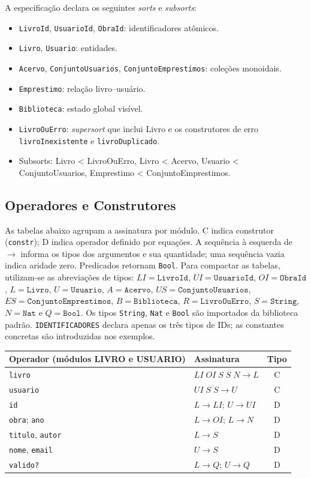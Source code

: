 \documentclass[a4paper,12pt]{article}
\begin{document}
A especificação declara os seguintes \textit{sorts} e \textit{subsorts}:
\begin{itemize}
    \item \texttt{LivroId}, \texttt{UsuarioId}, \texttt{ObraId}: identificadores
          atômicos.
    \item \texttt{Livro}, \texttt{Usuario}: entidades.
    \item \texttt{Acervo}, \texttt{ConjuntoUsuarios},
          \texttt{ConjuntoEmprestimos}: coleções monoidais.
    \item \texttt{Emprestimo}: relação livro–usuário.
    \item \texttt{Biblioteca}: estado global visível.
    \item \texttt{LivroOuErro}: \textit{supersort} que inclui Livro e os
          construtores de erro \texttt{livroInexistente} e
          \texttt{livroDuplicado}.
    \item Subsorts: Livro < LivroOuErro, Livro < Acervo, Usuario <
          ConjuntoUsuarios, Emprestimo < ConjuntoEmprestimos.
\end{itemize}

\subsection{Operadores e Construtores}

As tabelas abaixo agrupam a assinatura por módulo. C indica construtor
(\texttt{constr}); D indica operador definido por equações. A sequência à
esquerda de $\to$ informa os tipos dos argumentos e sua quantidade; uma
sequência vazia indica aridade zero. Predicados retornam \texttt{Bool}.
Para compactar as tabelas, utilizam-se as abreviações de tipos:
\(LI=\texttt{LivroId}\), \(UI=\texttt{UsuarioId}\),
\(OI=\texttt{ObraId}\), \(L=\texttt{Livro}\),
\(U=\texttt{Usuario}\), \(A=\texttt{Acervo}\),
\(US=\texttt{ConjuntoUsuarios}\), \(ES=\texttt{ConjuntoEmprestimos}\),
\(B=\texttt{Biblioteca}\), \(R=\texttt{LivroOuErro}\),
\(S=\texttt{String}\), \(N=\texttt{Nat}\) e \(Q=\texttt{Bool}\).
Os tipos \texttt{String}, \texttt{Nat} e \texttt{Bool} são importados da
biblioteca padrão. \texttt{IDENTIFICADORES} declara apenas os três tipos de IDs;
as constantes concretas são introduzidas nos exemplos.

\begin{center}
\small
\begin{tabularx}{\linewidth}{@{}Y l c@{}}
\toprule
Operador (módulos LIVRO e USUARIO) & Assinatura & Tipo \\
\midrule
\texttt{livro} & $LI\;OI\;S\;S\;N\to L$ & C \\
\texttt{usuario} & $UI\;S\;S\to U$ & C \\
\texttt{id} & $L\to LI$; $U\to UI$ & D \\
\texttt{obra}; \texttt{ano} & $L\to OI$; $L\to N$ & D \\
\texttt{titulo}, \texttt{autor} & $L\to S$ & D \\
\texttt{nome}, \texttt{email} & $U\to S$ & D \\
\texttt{valido?} & $L\to Q$; $U\to Q$ & D \\
\bottomrule
\end{tabularx}
\end{center}
\end{document}
